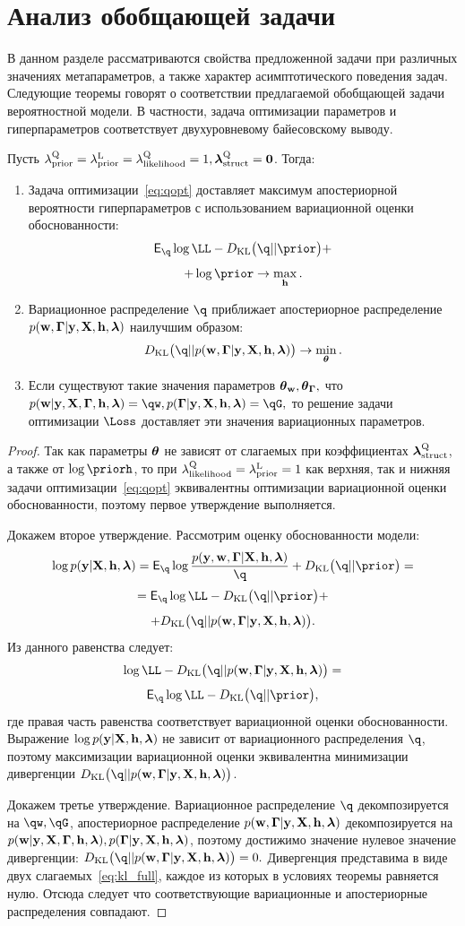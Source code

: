 \section{Анализ обобщающей задачи}
В данном разделе рассматриваются свойства предложенной задачи при различных значениях метапараметров, а также характер асимптотического поведения задач.
Следующие теоремы говорят о соответствии предлагаемой обобщающей задачи вероятностной модели. В частности, задача оптимизации параметров и гиперпараметров соответствует двухуровневому байесовскому выводу.
\begin{theorem}
Пусть ${\lambda_\text{prior}^\text{Q}} = \lambda_\text{prior}^\text{L}=\lambda_\text{likelihood}^\text{Q} = 1, \boldsymbol{\lambda}_\text{struct}^\text{Q}=\mathbf{0}$. Тогда:
\begin{enumerate}
\item Задача оптимизации~\eqref{eq:qopt} доставляет максимум апостериорной вероятности гиперпараметров с использованием вариационной оценки обоснованности:
\vspace{-0.3cm}
\[
    \E_{\q}\log \LL - \KL{\q}{\prior} +
\]
\[
+ \log \prior \to \max_{\h}.
\]
\item Вариационное распределение $\q$ приближает апостериорное распределение $p(\mathbf{w}, \boldsymbol{\Gamma}|\mathbf{y}, \mathbf{X}, \mathbf{h},\boldsymbol{\lambda})$ наилучшим образом:
\vspace{-0.3cm}
\[
    \KL{\q}{\post} \to \min_{\teta}.
\]


\item Если существуют такие значения параметров $\boldsymbol{\theta}_\mathbf{w}, \boldsymbol{\theta}_{\boldsymbol{\Gamma}},$ что $\postw = \qw, \postG = \qG,$
то решение задачи оптимизации $\Loss$ доставляет эти значения вариационных параметров.  
\end{enumerate}
\end{theorem}
\begin{proof}
Так как параметры $\boldsymbol{\theta}$ не зависят от слагаемых при коэффициентах $\boldsymbol{\lambda}_\text{struct}^\text{Q}$, а также от $\log \priorh$, то 
при $\lambda_\text{likelihood}^\text{Q} = \lambda_\text{prior}^\text{L} = 1$ как верхняя, так и нижняя задачи оптимизации~\eqref{eq:qopt} эквивалентны оптимизации вариационной оценки обоснованности, поэтому первое утверждение выполняется.

Докажем второе утверждение. Рассмотрим оценку обоснованности модели: 
\[
\log \EV  = \E_{\q} \log\frac{p(\y, \w, \G|\X, \h, \lam)}{\q} + \KL{\q}{\prior} = 
 \]
\[
=\E_{\q} \log \LL - \KL{\q}{\prior}+
\]
\[
 + \KL{\q}{\post}.
\]
Из данного равенства следует:
\[
\log \LL - \KL{\q}{\post} = 
\]
\[
\E_{\q}\log \LL - \KL{\q}{\prior},
\]
где правая часть равенства соответствует вариационной оценки обоснованности. Выражение $\log p(\mathbf{y}|\mathbf{X}, \mathbf{h},\boldsymbol{\lambda})$ не зависит от вариационного распределения  $\q$, поэтому максимизации вариационной оценки эквивалентна минимизации дивергенции $\KL{\q}{\post}$.

Докажем третье утверждение. Вариационное распределение $\q$ декомпозируется на $\qw, \qG$, апостериорное распределение $p(\mathbf{w}, \boldsymbol{\Gamma}|\mathbf{y}, \mathbf{X}, \mathbf{h},\boldsymbol{\lambda})$ декомпозируется на $p(\mathbf{w}|\mathbf{y}, \mathbf{X}, \boldsymbol{\Gamma}, \mathbf{h},\boldsymbol{\lambda}), p(\boldsymbol{\Gamma}|\mathbf{y}, \mathbf{X}, \mathbf{h},\boldsymbol{\lambda})$, поэтому достижимо значение нулевое значение
дивергенции: $\KL{\q}{\post} = 0.$
Дивергенция представима в  виде двух слагаемых~\eqref{eq:kl_full}, каждое из которых в условиях теоремы равняется нулю.
Отсюда следует что соответствующие вариационные и апостериорные распределения совпадают.
\end{proof}

